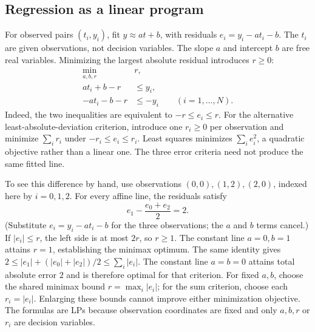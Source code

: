 \documentclass[11pt,a4paper]{article}
\begin{document}
\subsection{Regression as a linear program}
For observed pairs $(t_i,y_i)$, fit $y\approx at+b$, with residuals
$e_i=y_i-at_i-b$. The $t_i$ are given observations, not decision variables.
The slope $a$ and intercept $b$ are free real variables.
Minimizing the largest absolute residual introduces $r\geq0$:
\begin{align*}
  \min_{a,b,r}\quad&r,\\
  at_i+b-r&\leq y_i,\\
  -at_i-b-r&\leq-y_i\qquad(i=1,\ldots,N).
\end{align*}
Indeed, the two inequalities are equivalent to $-r\leq e_i\leq r$.
For the alternative least-absolute-deviation criterion, introduce one $r_i\geq0$
per observation and minimize $\sum_i r_i$ under $-r_i\leq e_i\leq r_i$.
Least squares minimizes $\sum_i e_i^2$, a quadratic objective rather than
a linear one.
The three error criteria need not produce the same fitted line.

To see this difference by hand, use observations $(0,0),(1,2),(2,0)$,
indexed here by $i=0,1,2$.
For every affine line, the residuals satisfy
\[
  e_1-\frac{e_0+e_2}{2}=2.
\]
(Substitute $e_i=y_i-at_i-b$ for the three observations; the $a$ and $b$
terms cancel.)
If $|e_i|\leq r$, the left side is at most $2r$, so $r\geq1$.
The constant line $a=0,b=1$ attains $r=1$, establishing the minimax optimum.
The same identity gives
$2\leq |e_1|+(|e_0|+|e_2|)/2\leq\sum_i|e_i|$.
The constant line $a=b=0$ attains total absolute error $2$ and is therefore
optimal for that criterion. For fixed $a,b$, choose the shared minimax bound
$r=\max_i|e_i|$; for the sum criterion, choose each $r_i=|e_i|$.
Enlarging these bounds cannot improve either minimization objective.
The formulas are LPs because observation
coordinates are fixed and only $a,b,r$ or $r_i$ are decision variables.
\end{document}

